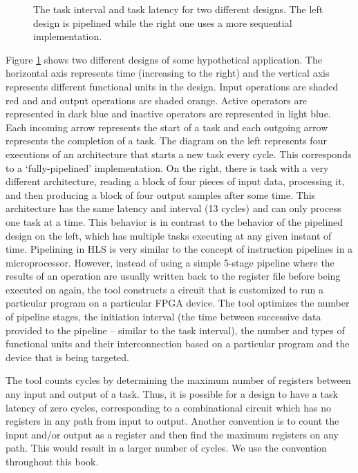 \begin{figure}
\centering
\begin{footnotesize}
\def\svgwidth{\columnwidth}

\end{footnotesize}
\caption{The task interval and task latency for two different designs. The left design is pipelined while the right one uses a more sequential implementation.}
\label{fig:intervalDuration}
\end{figure}

Figure \ref{fig:intervalDuration} shows two different designs of some hypothetical application.   The horizontal axis represents time (increasing to the right) and the vertical axis represents different functional units in the design.  Input operations are shaded red and and output operations are shaded orange.  Active operators are represented in dark blue and inactive operators are represented in light blue.  Each incoming arrow represents the start of a task and each outgoing arrow represents the completion of a task.  The diagram on the left represents four executions of an architecture that starts a new task every cycle. This corresponds to a `fully-pipelined' implementation. On the right, there is task with a very different architecture, reading a block of four pieces of input data, processing it, and then producing a block of four output samples after some time.  This architecture has the same latency and interval (13 cycles) and can only process one task at a time.  This behavior is in contrast to the behavior of the pipelined design on the left, which has multiple tasks executing at any given instant of time.  Pipelining in HLS is very similar to the concept of instruction pipelines in a microprocessor.  However, instead of using a simple 5-stage pipeline where the results of an operation are usually written back to the register file before being executed on again, the \VHLS tool constructs a circuit that is customized to run a particular program on a particular FPGA device.  The tool optimizes the number of pipeline stages, the initiation interval (the time between successive data provided to the pipeline -- similar to the task interval), the number and types of functional units and their interconnection based on a particular program and the device that is being targeted.

The \VHLS tool counts cycles by determining the maximum number of registers between any input and output of a task. Thus, it is possible for a design to have a task latency of zero cycles, corresponding to a combinational circuit which has no registers in any path from input to output. Another convention is to count the input and/or output as a register and then find the maximum registers on any path. This would result in a larger number of cycles. We use the \VHLS convention throughout this book.

